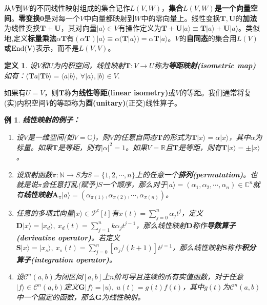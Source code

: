\documentclass[mathserif,hyperref,UTF8,openany,b5paper]{ctexbook}
\newtheorem{exmp}{例}[section]
\newtheorem{defn}{定义}[section]
\begin{document}
从$V$到$W$的不同线性映射组成的集合记作$L(V,W)$，\textbf{集合$L(V,W)$是一个向量空间}。\textbf{零变换}$\mathbf{0}$是对每一个$V$中向量都映射到$W$中的零向量上。线性变换$\mathbf{T,U}$的\textbf{加法}为线性变换$\mathbf{T+U}$，其对向量$|a\rangle \in V$有操作定义为$\mathbf{T+U}|a \rangle \equiv \mathbf{T}|a\rangle + \mathbf{U}|a\rangle$。类似地,定义\textbf{标量乘法}$\alpha\mathbf{T}$有$(\alpha\mathbf{T})|a\rangle\equiv\alpha(\mathbf{T}|a\rangle)=\alpha\mathbf{T}|a\rangle$。$V$的\textbf{自同态}的集合用$L(V)$或$\rm End(V)$表示，而不是$L(V,V)$。

\begin{defn}
设$V$和$U$为内积空间，线性映射$\mathbf{T}:
V\xrightarrow{}U$称为\textbf{等距映射(isometric map)}如有：$\langle \mathbf{T}a|\mathbf{T}b\rangle = \langle a|b\rangle, \ \forall |a\rangle,|b\rangle\in V.$
\end{defn}

如果有$U = V$，则$\mathbf{T}$称为\textbf{线性等距(linear isometry)}或$V$的等距。我们通常将复(实)内积空间$V$的等距称为\textbf{酉(unitary)}(正交)线性算子。
\begin{exmp} \textbf{线性映射的例子：}
\begin{enumerate}
\item 设$V$是一维空间(如$V = \mathbb{C}$)，则$V$的任意自同态$\mathbf{T}$的形式为$\mathbf{T}|x\rangle = \alpha|x\rangle$，其中$\alpha$为标量。如果$\mathbf{T}$是等距，则有$|\alpha|^2 = 1$。如果$V=\mathbb{R}$且$\mathbf{T}$是等距，则有$\mathbf{T}|x\rangle =\pm|x\rangle$。
\item 设双射函数$\pi:\mathbb{N}\xrightarrow{}S$为$S=\{1,2,\cdots,n\}$上的任意一个\textbf{排列(permutation)}。也就是说$\pi$会任意打乱(赋予)$S$一个顺序，那么对于$|a\rangle=(\alpha_1,\alpha_2,\cdots,\alpha_n)\in\mathbb{C}^n$就有\textbf{线性映射}$\mathbf{A}_\pi|a\rangle=(\alpha_{\pi(1)},\alpha_{\pi(2)},\cdots,\alpha_{\pi(n)})$。
\item 任意的多项式向量$|x\rangle\in \mathcal{P}^c[t]$有$x(t)=\sum_{j=0}^n\alpha_jt^j$，定义$\mathbf{D}|x\rangle = |x_d\rangle, \ x_d(t)=\sum_{j=1}^n k\alpha_jt^{j-1}$，那么线性映射$\mathbf{D}$称作\textbf{导数算子(derivative operator)}。若定义$\mathbf{S}|x\rangle = |x_s\rangle,\ x_s(t)=\sum_{j=0}^n [\alpha_j/(k+1)]t^{j=1}$，那么线性映射$\mathbf{S}$称作\textbf{积分算子(integration operator)}。
\item 设$\mathcal{C}^n(a,b)$为闭区间$[a,b]$上$n$阶可导且连续的所有实值函数，对于任意$|f\rangle\in \mathcal{C}^n(a,b)$定义$\mathbf{G}|f\rangle=|u\rangle, \ u(t)=g(t)f(t)$，其中$g(t)$为$\mathcal{C}^n(a,b)$中一个固定的函数，那么$\mathbf{G}$为线性映射。
\end{enumerate}
\end{exmp}
\end{document}

